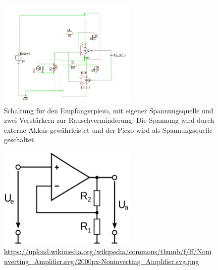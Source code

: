 \documentclass[12pt,a4paper,titlepage,headinclude,bibtotoc]{scrartcl}
\numberwithin{equation}{subsection}
\begin{document}
\begin{figure}[!h]
\centering
\includegraphics[width=0.6\textwidth]{Fotos/Echoverstaerker.png}
\caption{Schaltung für den Empfängerpiezo, mit eigener Spannungsquelle und zwei Verstärkern zur Rauschverminderung. Die Spannung wird durch externe Akkus gewährleistet und der Piezo wird als Spannungsquelle geschaltet.}
\label{fig:Echoverstaerker}
\end{figure}





\begin{figure}[h]
	\centering
	\includegraphics[width=0.6\textwidth]{nicht.png}
	\caption{\url{https://upload.wikimedia.org/wikipedia/commons/thumb/f/ff/Noninverting_Amplifier.svg/2000px-Noninverting_Amplifier.svg.png}}
	\label{fig:nicht}
\end{figure}
\end{document}
